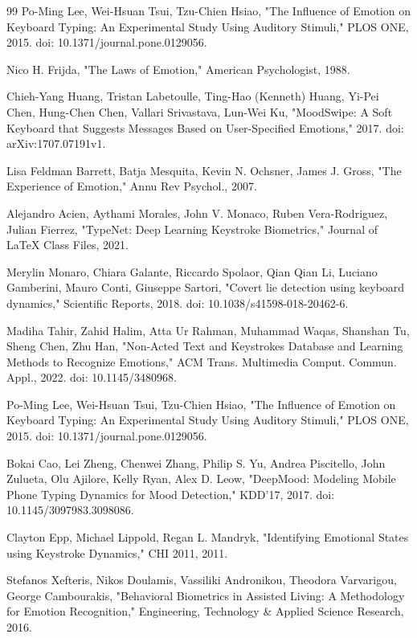 \documentclass[conference]{IEEEtran}
\begin{document}
\begin{thebibliography}{99}
Po-Ming Lee, Wei-Hsuan Tsui, Tzu-Chien Hsiao, "The Influence of Emotion on Keyboard Typing: An Experimental Study Using Auditory Stimuli," PLOS ONE, 2015. doi: 10.1371/journal.pone.0129056.

Nico H. Frijda, "The Laws of Emotion," American Psychologist, 1988.

Chieh-Yang Huang, Tristan Labetoulle, Ting-Hao (Kenneth) Huang, Yi-Pei Chen, Hung-Chen Chen, Vallari Srivastava, Lun-Wei Ku, "MoodSwipe: A Soft Keyboard that Suggests Messages Based on User-Specified Emotions," 2017. doi: arXiv:1707.07191v1.

Lisa Feldman Barrett, Batja Mesquita, Kevin N. Ochsner, James J. Gross, "The Experience of Emotion," Annu Rev Psychol., 2007.

Alejandro Acien, Aythami Morales, John V. Monaco, Ruben Vera-Rodriguez, Julian Fierrez, "TypeNet: Deep Learning Keystroke Biometrics," Journal of LaTeX Class Files, 2021.

Merylin Monaro, Chiara Galante, Riccardo Spolaor, Qian Qian Li, Luciano Gamberini, Mauro Conti, Giuseppe Sartori, "Covert lie detection using keyboard dynamics," Scientific Reports, 2018. doi: 10.1038/s41598-018-20462-6.

Madiha Tahir, Zahid Halim, Atta Ur Rahman, Muhammad Waqas, Shanshan Tu, Sheng Chen, Zhu Han, "Non-Acted Text and Keystrokes Database and Learning Methods to Recognize Emotions," ACM Trans. Multimedia Comput. Commun. Appl., 2022. doi: 10.1145/3480968.

Po-Ming Lee, Wei-Hsuan Tsui, Tzu-Chien Hsiao, "The Influence of Emotion on Keyboard Typing: An Experimental Study Using Auditory Stimuli," PLOS ONE, 2015. doi: 10.1371/journal.pone.0129056.

Bokai Cao, Lei Zheng, Chenwei Zhang, Philip S. Yu, Andrea Piscitello, John Zulueta, Olu Ajilore, Kelly Ryan, Alex D. Leow, "DeepMood: Modeling Mobile Phone Typing Dynamics for Mood Detection," KDD'17, 2017. doi: 10.1145/3097983.3098086.

Clayton Epp, Michael Lippold, Regan L. Mandryk, "Identifying Emotional States using Keystroke Dynamics," CHI 2011, 2011.

Stefanos Xefteris, Nikos Doulamis, Vassiliki Andronikou, Theodora Varvarigou, George Cambourakis, "Behavioral Biometrics in Assisted Living: A Methodology for Emotion Recognition," Engineering, Technology \& Applied Science Research, 2016.


\end{thebibliography}
\end{document}
